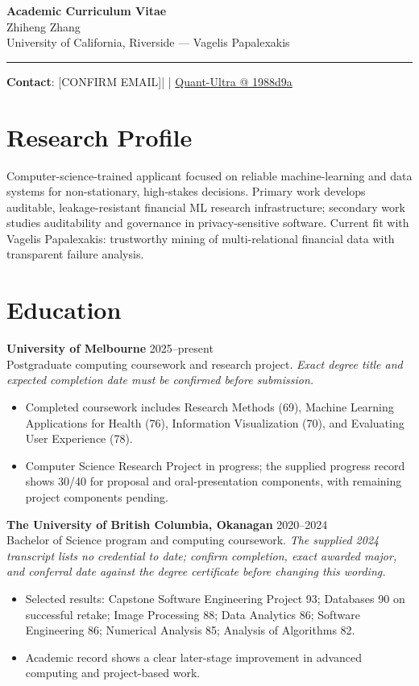 \documentclass[11pt]{article}
\makeatletter
\newcommand{\ApplicantName}{Zhiheng Zhang}
\newcommand{\ApplicantEmail}{[CONFIRM EMAIL]}
\newcommand{\ApplicantPhone}{[CONFIRM PHONE]}
\newcommand{\ApplicantGitHub}{\href{https://github.com/zhiheng-zhang-Mera/Quant-Ultra/tree/1988d9a8530da91a8158de864d098ea869098923}{Quant-Ultra @ 1988d9a}}
\makeatother
\begin{document}
\begin{center}
{\LARGE\bfseries Academic Curriculum Vitae}\\[0.25em]
{\large \ApplicantName}\\
University of California, Riverside --- Vagelis Papalexakis
\end{center}
\vspace{0.35em}\hrule\vspace{0.65em}

\textbf{Contact}: \ApplicantEmail\quad | \quad \ApplicantPhone\quad | \quad \ApplicantGitHub

\section*{Research Profile}
Computer-science-trained applicant focused on reliable machine-learning and data systems for non-stationary, high-stakes decisions. Primary work develops auditable, leakage-resistant financial ML research infrastructure; secondary work studies auditability and governance in privacy-sensitive software. Current fit with Vagelis Papalexakis: trustworthy mining of multi-relational financial data with transparent failure analysis.

\section*{Education}
\textbf{University of Melbourne} \hfill 2025--present\\
Postgraduate computing coursework and research project. \textit{Exact degree title and expected completion date must be confirmed before submission.}
\begin{itemize}
\item Completed coursework includes Research Methods (69), Machine Learning Applications for Health (76), Information Visualization (70), and Evaluating User Experience (78).
\item Computer Science Research Project in progress; the supplied progress record shows 30/40 for proposal and oral-presentation components, with remaining project components pending.
\end{itemize}

\textbf{The University of British Columbia, Okanagan} \hfill 2020--2024\\
Bachelor of Science program and computing coursework. \textit{The supplied 2024 transcript lists no credential to date; confirm completion, exact awarded major, and conferral date against the degree certificate before changing this wording.}
\begin{itemize}
\item Selected results: Capstone Software Engineering Project 93; Databases 90 on successful retake; Image Processing 88; Data Analytics 86; Software Engineering 86; Numerical Analysis 85; Analysis of Algorithms 82.
\item Academic record shows a clear later-stage improvement in advanced computing and project-based work.
\end{itemize}
\end{document}

